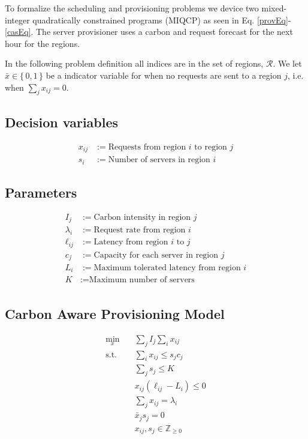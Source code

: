 To formalize the scheduling and provisioning problems we device two mixed-integer quadratically constrained programs (MIQCP) as seen in Eq. \ref{provEq}-\ref{casEq}.
The server provisioner uses a carbon and request forecast for the next hour for the regions.

In the following problem definition all indices are in the set of regions, $\mathcal{R}$. We let $\bar{x}\in\{\,0,1\,\}$ be a indicator variable for when no requests are sent to a region $j$, i.e. when $\sum_j x_{ij}=0$.

\subsection{Decision variables}
\begin{equation*}
\begin{aligned}
x_{ij} &:= \text{Requests from region $i$ to region $j$} \\
s_i &:= \text{Number of servers in region $i$}
\end{aligned}
\end{equation*}


\subsection{Parameters}
\begin{equation*}
\begin{aligned}
I_j &:= \text{Carbon intensity in region $j$}\\
\lambda_i &:= \text{Request rate from region $i$}\\
\ell_{ij} &:= \text{Latency from region $i$ to $j$}  \\
c_j &:= \text{Capacity for each server in region } j \\
L_{i} &:= \text{Maximum tolerated latency from region $i$}  \\
K &:= \text{Maximum number of servers } \\
\end{aligned}
\end{equation*}

\subsection{Carbon Aware Provisioning Model}
\label{sec:capm}

\begin{subequations}
    \begin{align}
    \underset{x}{\min} \quad & \sum_j I_j\sum_i x_{ij} \\
    \text{s.t.}  \quad & \sum_i x_{ij} \leq s_jc_j \\
    & \sum_j s_j \leq K \\
    & x_{ij}\left(\ell_{ij}-L_i\right) \leq 0 \\
    & \sum_j x_{ij} = \lambda_i \\
    & \bar{x}_js_j=0 \\
    & x_{ij},s_j \in\mathbb{Z}_{\geq 0}
    \end{align}
    \label{provEq}
\end{subequations}


